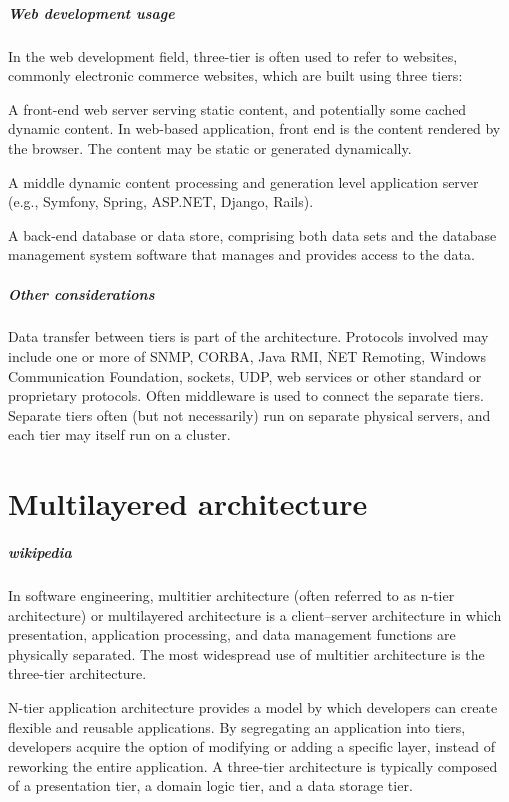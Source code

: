\documentclass{book}
\begin{document}
\paragraph{Web development usage}

In the web development field, three-tier is often used to refer to websites, commonly electronic commerce websites, which are built using three tiers:

    A front-end web server serving static content, and potentially some cached dynamic content. In web-based application, front end is the content rendered by the browser.
    The content may be static or generated dynamically.

    A middle dynamic content processing and generation level application server (e.g., Symfony, Spring, ASP.NET, Django, Rails).

    A back-end database or data store, comprising both data sets and the database management system software that manages and provides access to the data.

\paragraph{Other considerations}
Data transfer between tiers is part of the architecture.
Protocols involved may include one or more of SNMP, CORBA, Java RMI, \.NET Remoting, Windows Communication Foundation, sockets, UDP, web services or other standard or proprietary protocols.
Often middleware is used to connect the separate tiers. Separate tiers often (but not necessarily) run on separate physical servers, and each tier may itself run on a cluster.
\chapter{Multilayered architecture}
\paragraph{wikipedia}
In software engineering, multitier architecture (often referred to as n-tier architecture) or multilayered architecture is a client–server architecture in which presentation,
application processing, and data management functions are physically separated. The most widespread use of multitier architecture is the three-tier architecture.

N-tier application architecture provides a model by which developers can create flexible and reusable applications.
By segregating an application into tiers, developers acquire the option of modifying or adding a specific layer, instead of reworking the entire application.
A three-tier architecture is typically composed of a presentation tier, a domain logic tier, and a data storage tier.
\end{document}
